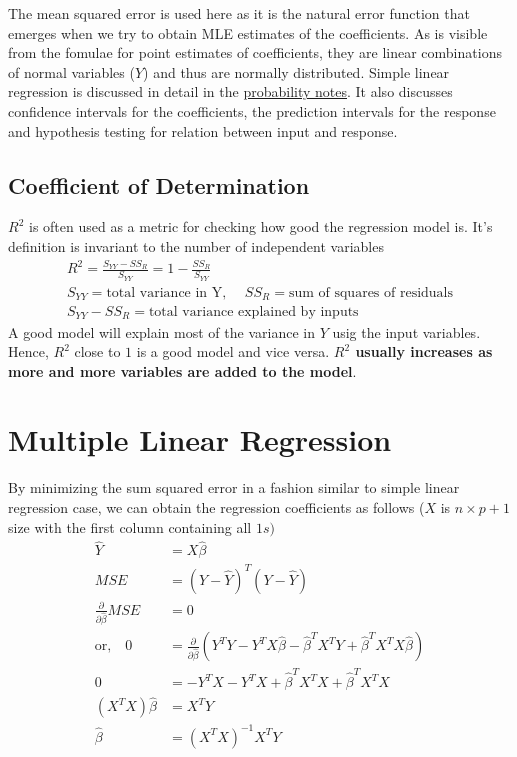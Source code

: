 \documentclass[../statistical_learning_notes.tex]{subfiles}
\begin{document}
The mean squared error is used here as it is the natural error function that emerges when we try to obtain MLE estimates of the coefficients. As is visible from the fomulae for point estimates of coefficients, they are linear combinations of normal variables ($Y$) and thus are normally distributed.\newline
Simple linear regression is discussed in detail in the \href{https://github.com/DragonWarrior15/statistical-learning-notes/blob/master/tex_files/probability/probability-notes.pdf}{probability notes}. It also discusses confidence intervals for the coefficients, the prediction intervals for the response and hypothesis testing for relation between input and response.\newline


\subsection{Coefficient of Determination}
$R^{2}$ is often used as a metric for checking how good the regression model is. It's definition is invariant to the number of independent variables
\begin{gather*}
    R^{2} = \frac{S_{YY} - SS_{R}}{S_{YY}} = 1 - \frac{SS_{R}}{S_{YY}}\\
    S_{YY} = \text{total variance in Y, }\quad SS_{R} = \text{sum of squares of residuals}\\
    S_{YY} - SS_{R} = \text{total variance explained by inputs}
\end{gather*}
A good model will explain most of the variance in $Y$ usig the input variables. Hence, $R^{2}$ close to $1$ is a good model and vice versa. \textbf{$R^{2}$ usually increases as more and more variables are added to the model}.


\section{Multiple Linear Regression}
By minimizing the sum squared error in a fashion similar to simple linear regression case, we can obtain the regression coefficients as follows ($X$ is $n \times p+1$ size with the first column containing all $1s)$
\begin{align*}
    \hat{Y} &= X\hat{\beta}\\
    MSE &= (Y-\hat{Y})^{T}(Y-\hat{Y})\\
    \frac{\partial}{\partial \hat{\beta}} MSE &= 0 \\
    \text{or,} \quad 0 &= \frac{\partial}{\partial \hat{\beta}} (Y^{T}Y - Y^{T}X\hat{\beta} - \hat{\beta}^{T}X^{T}Y + \hat{\beta}^{T}X^{T}X\hat{\beta})\\
    0 &= -Y^{T}X - Y^{T}X + \hat{\beta}^{T}X^{T}X + \hat{\beta}^{T}X^{T}X\\
    (X^{T}X)\hat{\beta} &= X^{T}Y\\
    \hat{\beta} &= (X^{T}X)^{-1}X^{T}Y
\end{align*}
\end{document}
